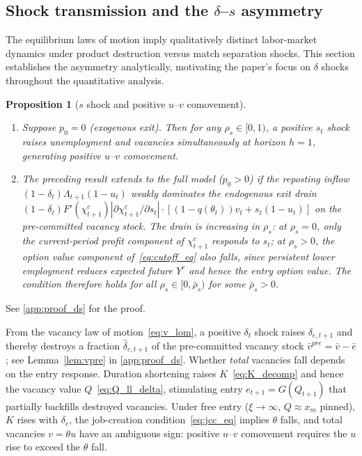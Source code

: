 \documentclass[authoryear, review, 12pt]{elsarticle}
\newtheorem{proposition}{Proposition}
\begin{document}
\subsection{Shock transmission and the \texorpdfstring{$\delta$--$s$}{delta-s} asymmetry}\label{sec:mechanism}

The equilibrium laws of motion imply qualitatively distinct labor-market dynamics under product destruction versus match separation shocks.
This section establishes the asymmetry analytically, motivating the paper's focus on $\delta$ shocks throughout the quantitative analysis.

\begin{proposition}[$s$ shock and positive $u$--$v$ comovement]
	\label{prop:ds_asymmetry}
	\leavevmode
	\begin{enumerate}
		\item Suppose $p_0=0$ (exogenous exit). Then
		for any $\rho_s\in[0,1)$, a positive $s_t$ shock raises
		unemployment and vacancies simultaneously at horizon $h=1$,
		generating positive $u$--$v$ comovement.
		\item The preceding result extends to the full model ($p_0>0$) if the
		reposting inflow $(1-\delta_t)\Lambda_{t+1}(1-u_t)$ weakly
		dominates the endogenous exit drain
		$(1-\delta_t)F'(\chi^c_{t+1})|\partial\chi^c_{t+1}/\partial s_t|
		\cdot[(1-q(\theta_t))v_t+s_t(1-u_t)]$
		on the pre-committed vacancy stock.
		The drain is increasing in $\rho_s$: at $\rho_s=0$, only
		the current-period profit component of $\chi^c_{t+1}$ responds
		to $s_t$; at $\rho_s>0$, the option value component
		of~\eqref{eq:cutoff_eq} also falls, since persistent lower
		employment reduces expected future $Y^c$ and hence the entry
		option value.
		The condition therefore holds for all
		$\rho_s\in[0,\bar\rho_s)$ for some $\bar\rho_s>0$.
	\end{enumerate}
\end{proposition}
\noindent See \ref{app:proof_ds} for the proof.


From the vacancy law of motion~\eqref{eq:v_lom}, a positive $\delta_t$
shock raises $\delta_{e,t+1}$ and thereby destroys a fraction
$\hat\delta_{e,t+1}$ of the pre-committed vacancy stock
$\bar{v}^{pre}=\bar{v}-\bar{e}$; see Lemma~\ref{lem:vpre} in \ref{app:proof_ds}.
Whether \emph{total} vacancies fall depends on the entry response.
Duration shortening raises $K$~\eqref{eq:K_decomp} and hence the
vacancy value $Q$~\eqref{eq:Q_ll_delta}, stimulating entry
$e_{t+1}=G(Q_{t+1})$ that partially backfills destroyed vacancies.
Under free entry ($\xi\to\infty$, $Q\approx x_m$ pinned), $K$ rises
with $\delta_e$, the job-creation condition~\eqref{eq:jcc_eq} implies
$\theta$ falls, and total vacancies $v=\theta u$ have an ambiguous sign:
positive $u$--$v$ comovement requires the $u$ rise to exceed the
$\theta$ fall.
\end{document}
